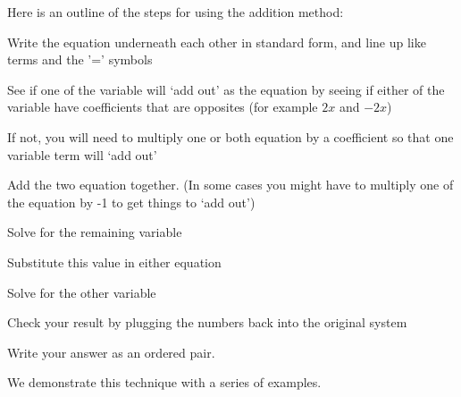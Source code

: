 Here is an outline of the steps for using the addition method:
\begin{steps}
	\item Write the equation underneath each other in standard form, and line up like terms and the '=' symbols
	\item See if one of the variable will `add out' as the equation by seeing if either of the variable have
	coefficients that are opposites (for example $2x$ and $-2x$)
	\item If not, you will need to multiply one or both equation by a coefficient so that one variable term will `add out'
	\item Add the two equation together. (In some cases you might have to multiply one of the equation by -1 to get
	things to `add out')
	\item Solve for the remaining variable
	\item Substitute this value in either equation
	\item Solve for the other variable
	\item Check your result by plugging the numbers back into the original system
	\item Write your answer as an ordered pair.
\end{steps} 
																											
We demonstrate this technique with a series of examples.
																											
